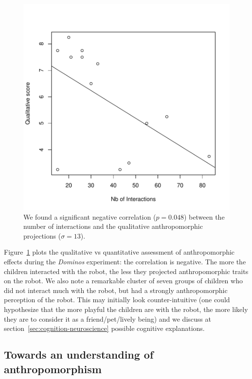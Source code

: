 \documentclass{frontiersSCNS} %
\begin{document}
\begin{figure}
    \centering
    \includegraphics[width=0.6\columnwidth]{ranger-interactions-vs-qualitative-score}
    \caption{We found a significant negative correlation ($p=0.048$) between the
    number of interactions and the qualitative anthropomorphic projections
    ($\sigma=13$).}
    \label{qualitative-score}
\end{figure}


Figure~\ref{qualitative-score} plots the qualitative vs quantitative assessment of
anthropomorphic effects during the \emph{Dominos} experiment: the correlation is
negative. The more the children interacted with the robot, the less they
projected anthropomorphic traits on the robot. We also note a remarkable cluster
of seven groups of children who did not interact much with the robot, but had a
strongly anthropomorphic perception of the robot. This may initially look
counter-intuitive (one could hypothesize that the more playful the children are
with the robot, the more likely they are to consider it as a friend/pet/lively
being) and we discuss at section~\ref{sec:cognition-neuroscience} possible
cognitive explanations.

\subsection{Towards an understanding of anthropomorphism}



%
%
%
%
%
%
%
%
%
\end{document}

